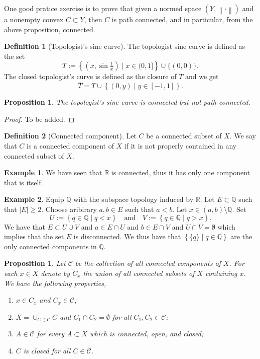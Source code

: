 \documentclass[11pt,a4paper]{article}
\theoremstyle{definition}
\newtheorem{definition}{Definition}[section]
\newtheorem{example}{Example}[section]
\theoremstyle{plain}
\newtheorem{proposition}[theorem]{Proposition}
\newcommand{\Q}{\mathbb{Q}}
\newcommand{\R}{\mathbb{R}}
\newcommand{\tand}{\quad \text{and} \quad}
\newcommand{\set}[2]{ \left\{ #1 \mid #2 \right\} }
\newcommand{\norm}[1]{\left\lVert #1\right\rVert}
\begin{document}
  One good pratice exercise is to prove that given a normed space
  $(Y,\norm{\cdot})$ and a nonempty convex $C \subset Y$, then $C$
  is path connected, and in particular, from the above proposition, connected.

  \begin{definition}[Topologist's sine curve]
    The topologist sine curve is defined as the set
    \[
      T := \set{\left(x,\sin {\tfrac {1}{x}}\right)}{x\in (0,1]} \cup \{(0,0)\}.
    \]
    The closed topologist's curve is defined as the closure of $T$ and
    we get
    \[
      \overline T = T \cup \set{(0,y)}{y \in [-1,1]}.
    \]
  \end{definition}

  \begin{proposition}
    The topologist's sine curve is connected but not path connected.
  \end{proposition}
  \begin{proof}
    To be added.
  \end{proof}

  \begin{definition}[Connected component]
    Let $C$ be a connected subset of $X$.
    We say that $C$ is a connected component of $X$ 
    if it is not properly contained in any connected subset of $X$.
  \end{definition}

  \begin{example}
    We have seen that $\R$ is connected, thus it has only one component
    that is itself.
  \end{example}

  \begin{example}
    Equip $\Q$ with the subspace topology induced by $\R$.
    Let $E \subset \Q$ such that $|E| \geq 2$.
    Choose aribirary $a,b \in E$ such that $a < b$.
    Let $x \in (a,b) \setminus \Q$. Set
    \[
      U := \set{q \in \Q}{q < x} \tand
      V := \set{q \in \Q}{q > x}.
    \]
    We have that $E \subset U \cup V$ and $a \in E \cap U$ and
    $b \in E \cap V$ and $U \cap V = \emptyset$ which implies that
    the set $E$ is disconnected.
    We thus have that $\set{\{q\}}{q \in \Q}$ are the only connected
    components in $\Q$.
  \end{example}

  \begin{proposition}
    Let $\mathcal C$ be the collection of all connected components of $X$.
    For each $x \in X$ denote by $C_x$ the union of all connected subsets 
    of $X$ containing $x$.
    We have the following properties,
    \begin{enumerate}
      \item[(1)] $x \in C_x$ and $C_x \in \mathcal C$;
      \item[(2)] $X = \cup_{C \in \mathcal C} C$ and $C_1 \cap C_2 = \emptyset$
        for all $C_1,C_2 \in \mathcal C$;
      \item[(3)] $A \in \mathcal C$ for every $A \subset X$ which is connected,
        open, and closed;
      \item[(4)] $C$ is closed for all $C \in \mathcal C$.
    \end{enumerate}
  \end{proposition}
\end{document}
